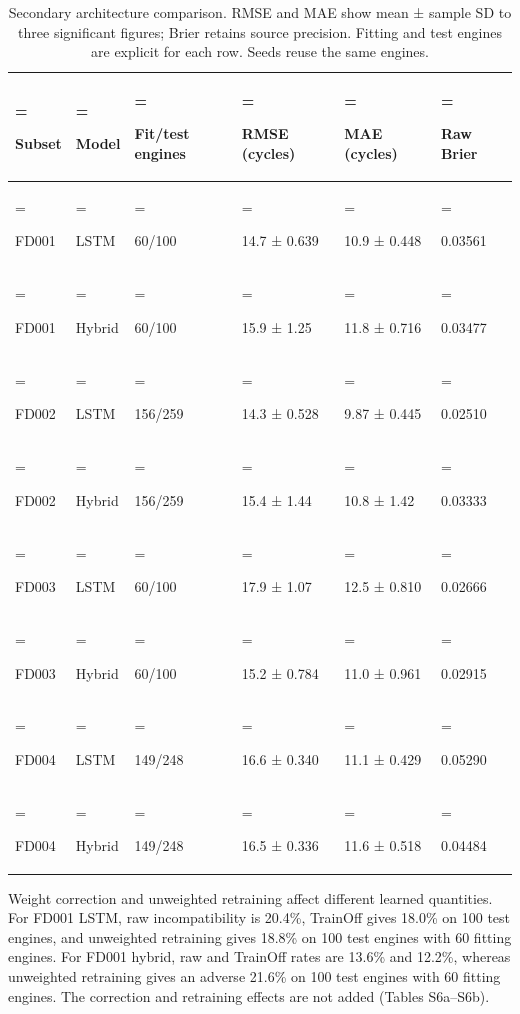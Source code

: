 \documentclass[IJPHM, 2026, 0]{phmsociety}
\begin{document}
\begin{table}[t]
\centering
\normalsize
\setlength{\tabcolsep}{3pt}
\renewcommand{\arraystretch}{1.12}
\setcounter{table}{2}
\caption{Secondary architecture comparison. RMSE and MAE show mean ± sample SD to three significant figures; Brier retains source precision. Fitting and test engines are explicit for each row. Seeds reuse the same engines.}
\label{tab:3}
\begin{tabularx}{\textwidth}{@{}>{\hsize=0.620000\hsize\linewidth=\hsize\raggedright\arraybackslash}X>{\hsize=0.650000\hsize\linewidth=\hsize\raggedright\arraybackslash}X>{\hsize=0.830000\hsize\linewidth=\hsize\raggedright\arraybackslash}X>{\hsize=1.300000\hsize\linewidth=\hsize\raggedright\arraybackslash}X>{\hsize=1.300000\hsize\linewidth=\hsize\raggedright\arraybackslash}X>{\hsize=1.300000\hsize\linewidth=\hsize\raggedright\arraybackslash}X@{}}
\toprule
Subset & Model & Fit/test engines & RMSE (cycles) & MAE (cycles) & Raw Brier \\
\midrule
FD001 & LSTM & \mbox{60}/\mbox{100} & \mbox{14.7} ± \mbox{0.639} & \mbox{10.9} ± \mbox{0.448} & \mbox{0.03561} \\
FD001 & Hybrid & \mbox{60}/\mbox{100} & \mbox{15.9} ± \mbox{1.25} & \mbox{11.8} ± \mbox{0.716} & \mbox{0.03477} \\
FD002 & LSTM & \mbox{156}/\mbox{259} & \mbox{14.3} ± \mbox{0.528} & \mbox{9.87} ± \mbox{0.445} & \mbox{0.02510} \\
FD002 & Hybrid & \mbox{156}/\mbox{259} & \mbox{15.4} ± \mbox{1.44} & \mbox{10.8} ± \mbox{1.42} & \mbox{0.03333} \\
FD003 & LSTM & \mbox{60}/\mbox{100} & \mbox{17.9} ± \mbox{1.07} & \mbox{12.5} ± \mbox{0.810} & \mbox{0.02666} \\
FD003 & Hybrid & \mbox{60}/\mbox{100} & \mbox{15.2} ± \mbox{0.784} & \mbox{11.0} ± \mbox{0.961} & \mbox{0.02915} \\
FD004 & LSTM & \mbox{149}/\mbox{248} & \mbox{16.6} ± \mbox{0.340} & \mbox{11.1} ± \mbox{0.429} & \mbox{0.05290} \\
FD004 & Hybrid & \mbox{149}/\mbox{248} & \mbox{16.5} ± \mbox{0.336} & \mbox{11.6} ± \mbox{0.518} & \mbox{0.04484} \\
\bottomrule
\end{tabularx}
\end{table}

Weight correction and unweighted retraining affect different learned quantities. For FD001 LSTM, raw incompatibility is \mbox{20.4}\%, TrainOff gives \mbox{18.0}\% on \mbox{100} test engines, and unweighted retraining gives \mbox{18.8}\% on \mbox{100} test engines with \mbox{60} fitting engines. For FD001 hybrid, raw and TrainOff rates are \mbox{13.6}\% and \mbox{12.2}\%, whereas unweighted retraining gives an adverse \mbox{21.6}\% on \mbox{100} test engines with \mbox{60} fitting engines. The correction and retraining effects are not added (Tables S6a--S6b).
\end{document}
